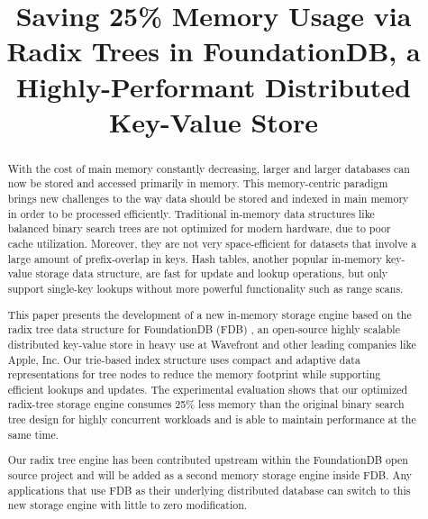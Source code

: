 \documentclass[sigplan,screen,nonacm]{acmart}
\begin{document}
\title{Saving 25\% Memory Usage via Radix Trees in FoundationDB, a Highly-Performant Distributed Key-Value Store}

\begin{abstract}
With the cost of main memory constantly decreasing, larger and larger databases can now be stored and accessed primarily in memory. This memory-centric paradigm brings new challenges to the way data should be stored and indexed in main memory in order to be processed efficiently. Traditional in-memory data structures like balanced binary search trees are not optimized for modern hardware, due to poor cache utilization. Moreover, they are not very space-efficient for datasets that involve a large amount of prefix-overlap in keys. Hash tables, another popular in-memory key-value storage data structure, are fast for update and lookup operations, but only support single-key lookups without more powerful functionality such as range scans. 

This paper presents the development of a new in-memory storage engine based on the radix tree data structure for FoundationDB (FDB) \cite{fdb}, an open-source highly scalable distributed key-value store in heavy use at Wavefront and other leading companies like Apple, Inc.  Our trie-based index structure uses compact and adaptive data representations for tree nodes to reduce the memory footprint while supporting efficient lookups and updates. The experimental evaluation shows that our optimized radix-tree storage engine consumes 25\% less memory than the original binary search tree design for highly concurrent workloads and is able to maintain performance at the same time. 

Our radix tree engine has been contributed upstream within the FoundationDB open source project and will be added as a second memory storage engine inside FDB. Any applications that use FDB as their underlying distributed database can switch to this new storage engine with little to zero modification.
 
\end{abstract}

\end{document}
